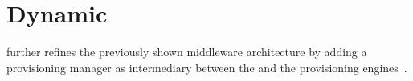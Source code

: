 \section{Dynamic}
\label{related:dynamic}

\citeauthor{provisioning:dynamic} further refines the previously shown middleware architecture by adding a provisioning manager as intermediary between the  and the provisioning engines~\autocite{provisioning:dynamic}.
